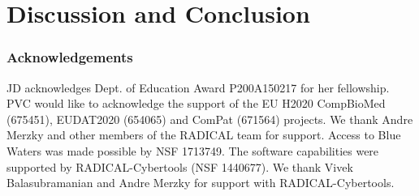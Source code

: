 \documentclass[conference]{IEEEtran}
\begin{document}
\section{Discussion and Conclusion}\label{sec:discussion}


\subsubsection*{Acknowledgements}
%

{\footnotesize JD acknowledges Dept. of Education Award P200A150217 for her fellowship. PVC
would like to acknowledge the support of the EU H2020 CompBioMed (675451),
EUDAT2020 (654065) and ComPat (671564) projects. We thank Andre Merzky and
other members of the RADICAL team for support. Access to Blue Waters was made
possible by NSF 1713749. The software capabilities were supported by
RADICAL-Cybertools (NSF 1440677). We thank Vivek Balasubramanian and Andre Merzky for support with RADICAL-Cybertools.}
\newpage



\end{document}
